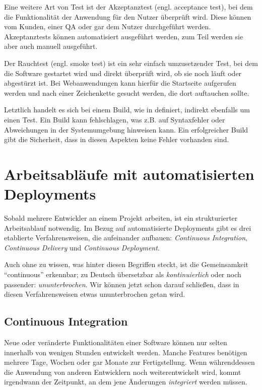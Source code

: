 Eine weitere Art von Test ist der Akzeptanztest (engl. acceptance test), bei dem die Funktionalität der Anwendung für den Nutzer überprüft wird. Diese können vom Kunden, einer \ac{QA} oder gar dem Nutzer durchgeführt werden. Akzeptanztests können automatisiert ausgeführt werden, zum Teil werden sie aber auch manuell ausgeführt. \citep[86]{Humble2010}

Der Rauchtest (engl. smoke test) ist ein sehr einfach umzusetzender Test, bei dem die Software gestartet wird und direkt überprüft wird, ob sie noch läuft oder abgestürzt ist. Bei Webanwendungen kann hierfür die Startseite aufgerufen werden und nach einer Zeichenkette gesucht werden, die dort auftauchen sollte. \citep[117]{Humble2010}

Letztlich handelt es sich bei einem Build, wie in  definiert, indirekt ebenfalls um einen Test. Ein Build kann fehlschlagen, was z.B. auf Syntaxfehler oder Abweichungen in der Systemumgebung hinweisen kann. Ein erfolgreicher Build gibt die Sicherheit, dass in diesen Aspekten keine Fehler vorhanden sind.

\section{Arbeitsabläufe mit automatisierten Deployments}

Sobald mehrere Entwickler an einem Projekt arbeiten, ist ein strukturierter Arbeitsablauf notwendig. Im Bezug auf automatisierte Deployments gibt es drei etablierte Verfahrensweisen, die aufeinander aufbauen: \emph{Continuous Integration}, \emph{Continuous Delivery} und \emph{Continuous Deployment}.

Auch ohne zu wissen, was hinter diesen Begriffen steckt, ist die Gemeinsamkeit ``continuous'' erkennbar; zu Deutsch übersetzbar als \emph{kontinuierlich} oder noch passender: \emph{ununterbrochen}. Wir können jetzt schon darauf schließen, dass in diesen Verfahrensweisen etwas ununterbrochen getan wird.

\subsection{Continuous Integration}

Neue oder veränderte Funktionalitäten einer Software können nur selten innerhalb von wenigen Stunden entwickelt werden. Manche Features benötigen mehrere Tage, Wochen oder gar Monate zur Fertigstellung. Wenn während\-dessen die Anwendung von anderen Entwicklern noch weiterentwickelt wird, kommt irgendwann der Zeitpunkt, an dem jene Änderungen \emph{integriert} werden müssen.

